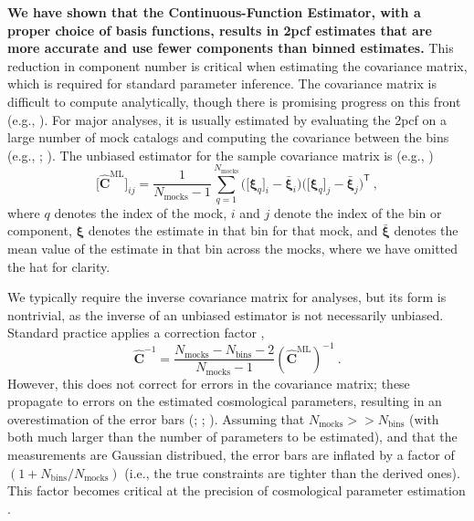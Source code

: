 \documentclass[modern]{aastex62}
\newcommand{\cf}{2pcf\xspace}
\newcommand{\est}{the Continuous-Function Estimator\xspace}
\newcommand{\inv}{^{-1}}
\newcommand{\T}{^{\mathsf{T}}}
\newcommand{\bld}[1]{\bm{#1}}
\newcommand{\NN}[1]{N_\mathrm{#1}}
\newcommand{\new}[1]{\textbf{#1}}
\begin{document}
\new{We have shown that \est, with a proper choice of basis functions, results in \cf estimates that are more accurate and use fewer components than binned estimates.}
This reduction in component number is critical when estimating the covariance matrix, which is required for standard parameter inference.
The covariance matrix is difficult to compute analytically, though there is promising progress on this front (e.g., \citealt{Wadekar2020}).
For major analyses, it is usually estimated by evaluating the \cf on a large number of mock catalogs and computing the covariance between the bins (e.g., \citealt{Reid2010}; \citealt{Anderson2014}).
The unbiased estimator for the sample covariance matrix is (e.g., \citealt{Anderson2003})
\begin{equation}
\big[ \bld{\hat{C}}^\mathrm{ML} \big]_{ij} = \frac{1}{\NN{mocks}-1} \sum_{q=1}^{\NN{mocks}} \bigg( \big[\bld{\xi}_q \big]_i - \bar{\bld{\xi}}_i \bigg) \bigg([\bld{\xi}_q \big]_j - \bar{\bld{\xi}}_j \bigg)\T ~,
\end{equation}
where $q$ denotes the index of the mock, $i$ and $j$ denote the index of the bin or component, $\bld{\xi}$ denotes the estimate in that bin for that mock, and $\bar{\bld{\xi}}$ denotes the mean value of the estimate in that bin across the mocks, where we have omitted the hat for clarity.

We typically require the inverse covariance matrix for analyses, but its form is nontrivial, as the inverse of an unbiased estimator is not necessarily unbiased.
Standard practice applies a correction factor \citep{Hartlap2007},
\begin{equation}
\bld{\hat{C}}\inv = \frac{\NN{mocks}-\NN{bins}-2}{\NN{mocks}-1} \left( \bld{\hat{C}}^\mathrm{ML} \right) \inv ~.
\end{equation}
However, this does not correct for errors in the covariance matrix; these propagate to errors on the estimated cosmological parameters, resulting in an overestimation of the error bars (\citealt{Hartlap2007}; \citealt{Dodelson2013} \citealt{Percival2014}; \citealt{TaylorJoachimi2014}).
Assuming that $\NN{mocks} >> \NN{bins}$ (with both much larger than the number of parameters to be estimated), and that the measurements are Gaussian distribued, the error bars are inflated by a factor of $(1 + \NN{bins}/\NN{mocks})$ (i.e., the true constraints are tighter than the derived ones).
This factor becomes critical at the precision of cosmological parameter estimation \citep{Percival2014}.
\end{document}
